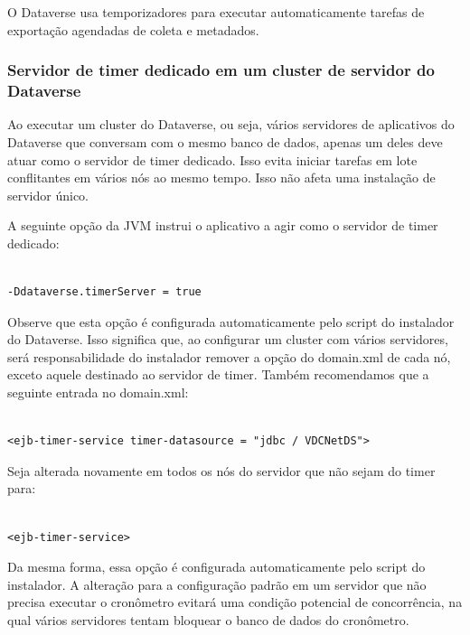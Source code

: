 \documentclass[12pt,hidelinks]{article}
\begin{document}
\qquad O Dataverse usa temporizadores para executar automaticamente tarefas de exportação agendadas de coleta e metadados.

\subsubsection{Servidor de timer dedicado em um cluster de servidor do Dataverse}

\qquad Ao executar um cluster do Dataverse, ou seja, vários servidores de aplicativos do Dataverse que conversam com o mesmo banco de dados, apenas um deles deve atuar como o servidor de timer dedicado. Isso evita iniciar tarefas em lote conflitantes em vários nós ao mesmo tempo. Isso não afeta uma instalação de servidor único.

A seguinte opção da JVM instrui o aplicativo a agir como o servidor de timer dedicado:

\begin{verbatim}

-Ddataverse.timerServer = true

\end{verbatim}

Observe que esta opção é configurada automaticamente pelo script do instalador do Dataverse. Isso significa que, ao configurar um cluster com vários servidores, será responsabilidade do instalador remover a opção do domain.xml de cada nó, exceto aquele destinado ao servidor de timer. Também recomendamos que a seguinte entrada no domain.xml:

\begin{verbatim}

<ejb-timer-service timer-datasource = "jdbc / VDCNetDS"> 

\end{verbatim}

Seja alterada novamente em todos os nós do servidor que não sejam do timer para: 

\begin{verbatim}

<ejb-timer-service> 

\end{verbatim}

Da mesma forma, essa opção é configurada automaticamente pelo script do instalador. A alteração para a configuração padrão em um servidor que não precisa executar o cronômetro evitará uma condição potencial de concorrência, na qual vários servidores tentam bloquear o banco de dados do cronômetro.
\end{document}
